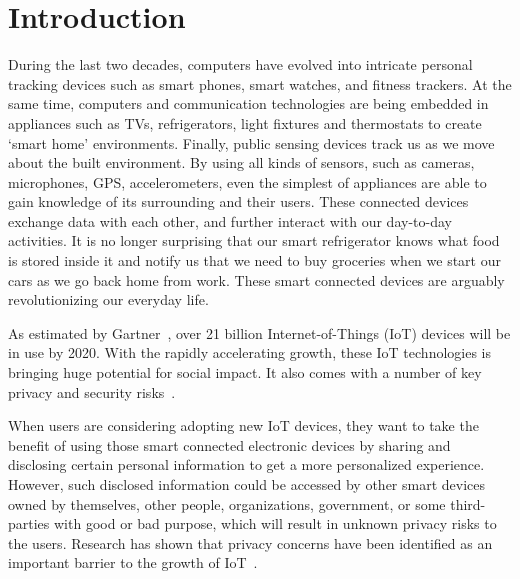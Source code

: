 \chapter{Introduction}\label{chapter:intro}
 
During the last two decades, computers have evolved into intricate personal tracking devices such as smart phones, smart watches, and fitness trackers. At the same time, computers and communication technologies are being embedded in appliances such as TVs, refrigerators, light fixtures and thermostats to create `smart home' environments. Finally, public sensing devices track us as we move about the built environment. By using all kinds of sensors, such as cameras, microphones, GPS, accelerometers, even the simplest of appliances are able to gain knowledge of its surrounding and their users. These connected devices exchange data with each other, and further interact with our day-to-day activities. It is no longer surprising that our smart refrigerator knows what food is stored inside it and notify us that we need to buy groceries when we start our cars as we go back home from work. These smart connected devices are arguably revolutionizing our everyday life.

As estimated by Gartner~\cite{eddy2015gartner}, over 21 billion Internet-of-Things (IoT) devices will be in use by 2020. With the rapidly accelerating growth, these IoT technologies is bringing huge potential for social impact. It also comes with a number of key privacy and security risks~\cite{yu2015handling}. 

When users are considering adopting new IoT devices, they want to take the benefit of using those smart connected electronic devices by sharing and disclosing certain personal information to get a more personalized experience. However, such disclosed information could be accessed by other smart devices owned by themselves, other people, organizations, government, or some third-parties with good or bad purpose, which will result in unknown privacy risks to the users. Research has shown that privacy concerns
have been identified as an important barrier to the growth of IoT~\cite{pricewaterhousecoopers_smart_nodate}.

